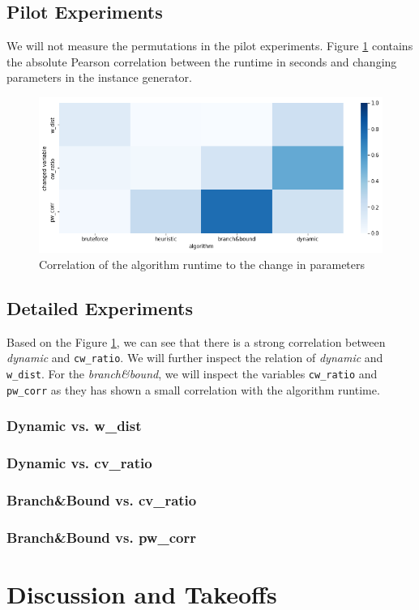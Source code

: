 \documentclass[a4paper,10pt]{article}
\begin{document}
\subsection{Pilot Experiments}

 We will not measure the permutations in the pilot experiments. Figure \ref{pilot_figure} contains the absolute Pearson correlation between the runtime in seconds and changing parameters in the instance generator.

\begin{figure}[!htb]
	\centering
  	\includegraphics[width=\textwidth]{images/pilot.png}
	\caption{Correlation of the algorithm runtime to the change in parameters}
	\label{pilot_figure}
\end{figure}

\subsection{Detailed Experiments}

Based on the Figure \ref{pilot_figure}, we can see that there is a strong correlation between \emph{dynamic} and \lstinline{cw_ratio}. We will further inspect the relation of \emph{dynamic} and \lstinline{w_dist}. For the \emph{branch\&bound}, we will inspect the variables \lstinline{cw_ratio} and \lstinline{pw_corr} as they has shown a small correlation with the algorithm runtime.

\subsubsection{Dynamic vs. w\_dist}

\subsubsection{Dynamic vs. cv\_ratio}

\subsubsection{Branch\&Bound vs. cv\_ratio}

\subsubsection{Branch\&Bound vs. pw\_corr}

\section{Discussion and Takeoffs}
\end{document}
